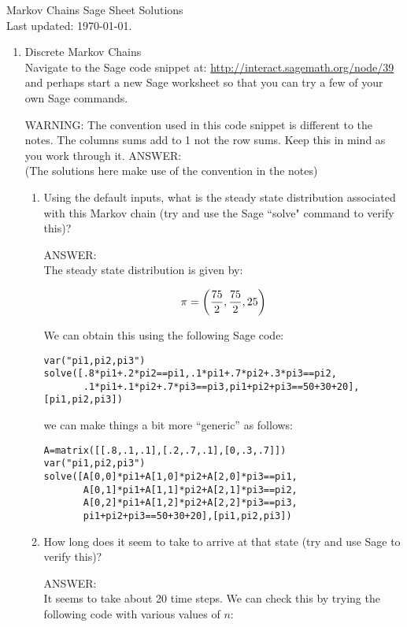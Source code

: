 \documentclass[12pt]{article}
\begin{document}
\begin{center}
\Huge{Markov Chains Sage Sheet Solutions}\\
\tiny{Last updated: \today.}
\end{center}

\begin{enumerate}
\item Discrete Markov Chains\\
Navigate to the Sage code snippet at: \url{http://interact.sagemath.org/node/39} and perhaps start a new Sage worksheet so that you can try a few of your own Sage commands.

WARNING: The convention used in this code snippet is different to the notes. The columns sums add to 1 not the row sums. Keep this in mind as you work through it.
ANSWER:\\(The solutions here make use of the convention in the notes)

\begin{enumerate}
\item Using the default inputs, what is the steady state distribution associated with this Markov chain (try and use the Sage ``solve" command to verify this)?

ANSWER:\\
The steady state distribution is given by:

$$\pi=\left({75\over 2},{75\over 2},25\right)$$

We can obtain this using the following Sage code:

\begin{verbatim}
var("pi1,pi2,pi3")
solve([.8*pi1+.2*pi2==pi1,.1*pi1+.7*pi2+.3*pi3==pi2,
       .1*pi1+.1*pi2+.7*pi3==pi3,pi1+pi2+pi3==50+30+20],[pi1,pi2,pi3])
\end{verbatim}

we can make things a bit more ``generic'' as follows:
\begin{verbatim}
A=matrix([[.8,.1,.1],[.2,.7,.1],[0,.3,.7]])
var("pi1,pi2,pi3")
solve([A[0,0]*pi1+A[1,0]*pi2+A[2,0]*pi3==pi1,
       A[0,1]*pi1+A[1,1]*pi2+A[2,1]*pi3==pi2,
       A[0,2]*pi1+A[1,2]*pi2+A[2,2]*pi3==pi3,
       pi1+pi2+pi3==50+30+20],[pi1,pi2,pi3])
\end{verbatim}

\item How long does it seem to take to arrive at that state (try and use Sage to verify this)?

ANSWER:\\
It seems to take about 20 time steps. We can check this by trying the following code with various values of $n$:


\end{enumerate}
\end{enumerate}
\end{document}
